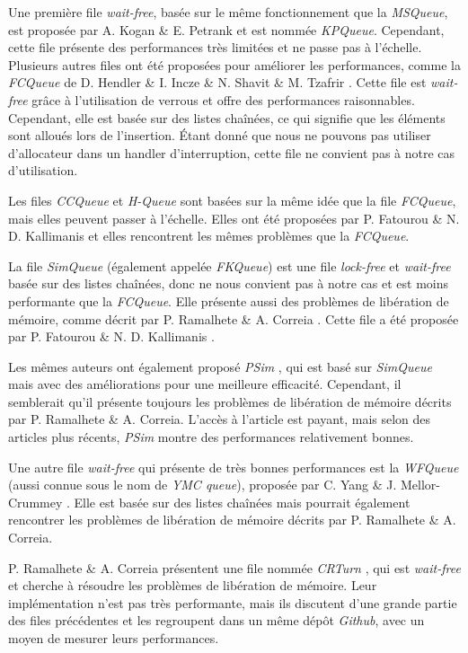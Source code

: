 Une première file \emph{wait-free}, basée sur le même fonctionnement que la \emph{MSQueue},
est proposée par A. Kogan \& E. Petrank \cite{10.1145/2038037.1941585} et est nommée \emph{KPQueue}.
Cependant, cette file présente des performances très limitées et ne passe pas à l'échelle.
Plusieurs autres files ont été proposées pour améliorer les performances,
comme la \emph{FCQueue} de D. Hendler \& I. Incze \& N. Shavit \& M. Tzafrir \cite{10.1145/1810479.1810540}.
Cette file est \emph{wait-free} grâce à l'utilisation de verrous et offre des performances raisonnables.
Cependant, elle est basée sur des listes chaînées, ce qui signifie que les éléments sont alloués lors de l'insertion.
Étant donné que nous ne pouvons pas utiliser d'allocateur dans un handler d'interruption,
cette file ne convient pas à notre cas d'utilisation.

Les files \emph{CCQueue} et \emph{H-Queue} sont basées sur la même idée que la file \emph{FCQueue}, mais elles peuvent passer à l'échelle.
Elles ont été proposées par P. Fatourou \& N. D. Kallimanis \cite{10.1145/2370036.2145849} et elles rencontrent les mêmes problèmes que la \emph{FCQueue}.

La file \emph{SimQueue} (également appelée \emph{FKQueue}) est une file \emph{lock-free} et \emph{wait-free} basée sur des listes chaînées,
donc ne nous convient pas à notre cas et est moins performante que la \emph{FCQueue}.
Elle présente aussi des problèmes de libération de mémoire, comme décrit par P. Ramalhete \& A. Correia \cite{10.1145/3155284.3019022}.
Cette file a été proposée par P. Fatourou \& N. D. Kallimanis \cite{10.1145/1989493.1989549}.

Les mêmes auteurs ont également proposé \emph{PSim} \cite{Fatourou2014}, qui est basé sur \emph{SimQueue} mais avec des améliorations pour une meilleure efficacité.
Cependant, il semblerait qu'il présente toujours les problèmes de libération de mémoire décrits par P. Ramalhete \& A. Correia.
L'accès à l'article est payant, mais selon des articles plus récents, \emph{PSim} montre des performances relativement bonnes.

Une autre file \emph{wait-free} qui présente de très bonnes performances est la \emph{WFQueue} (aussi connue sous le nom de \emph{YMC queue}),
proposée par C. Yang \& J. Mellor-Crummey \cite{10.1145/3016078.2851168}.
Elle est basée sur des listes chaînées mais pourrait également rencontrer les problèmes de libération de mémoire décrits par P. Ramalhete \& A. Correia.

P. Ramalhete \& A. Correia présentent une file nommée \emph{CRTurn} \cite{10.1145/3155284.3019022}, qui est \emph{wait-free} et cherche à résoudre les problèmes de libération de mémoire.
Leur implémentation n'est pas très performante, mais ils discutent d'une grande partie des files précédentes et les regroupent dans un même dépôt \emph{Github}, avec un moyen de mesurer leurs performances.

